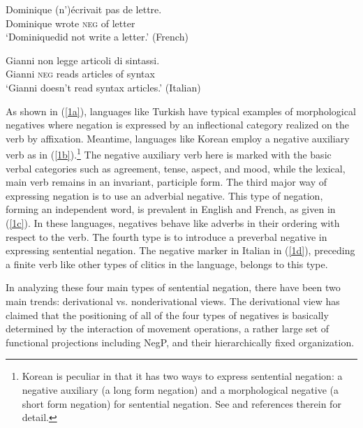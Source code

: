 \documentclass[output=paper
                ,modfonts
		,nonflat
	        ,collection
	        ,collectionchapter
	        ,collectiontoclongg
 	        ,biblatex  
                ,babelshorthands
                ,newtxmath
                ,draftmode
                ,colorlinks, citecolor=brown 
]{./langsci/langscibook}
\begin{document}
{\ex \label{1c}
\gll Dominique (n')\'{e}crivait pas de lettre.\\
     Dominique wrote \textsc{neg} of letter \\
\glt `Dominiquedid not write a letter.' (French)

\ex \label{1d} %
\gll Gianni non legge articoli di sintassi. \\
Gianni \textsc{neg} reads articles of syntax \\
\glt `Gianni doesn't read syntax articles.'  (Italian)
\zl

\noindent
As shown in (\ref{1a}), languages like Turkish
have typical examples of morphological negatives where
negation is expressed by an inflectional category realized on the
verb by affixation. Meantime, languages like Korean
 employ a negative auxiliary verb as in (\ref{1b}).\footnote{Korean
 is peculiar in that it has two ways to
 express sentential negation: a negative auxiliary (a long form
 negation)  and a morphological negative (a short form negation)
 for sentential negation. See \citet{Kim:00,Kim:16} and references therein for detail.}
  The negative auxiliary
 verb here is marked with the basic verbal categories such as agreement, tense, aspect, and mood, while the lexical, main verb remains in an invariant, participle form. The third major way of expressing negation is to use an adverbial
negative. This type of negation, forming an independent word, is prevalent in English and French, as given in (\ref{1c}). In these languages, negatives behave like adverbs in their ordering with respect to the verb. The fourth
type is to introduce a preverbal negative in
expressing sentential negation. The negative marker in Italian in (\ref{1d}), preceding a finite verb like other types of clitics in the language,
belongs to this type.


In analyzing these four main types of sentential negation, there have been two main trends: derivational vs. nonderivational views. The derivational view has claimed that the positioning of all of the
four types of negatives is basically determined by the interaction of movement
operations, a rather large set of functional projections including NegP,
and their hierarchically fixed organization.


\eal\label{exe:1}
\zl


\eal
{}
\zl


}
\end{document}
